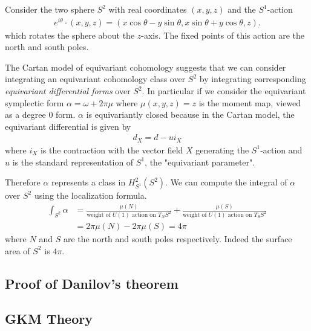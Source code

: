 \begin{example}
    Consider the two sphere $S^2$ with real coordinates $(x,y,z)$ and the $S^1$-action \begin{align*}
        e^{i\theta}\cdot(x,y,z) = (x\cos\theta - y\sin\theta, x\sin\theta + y\cos\theta, z).
    \end{align*}
    which rotates the sphere about the $z$-axis. The fixed points of this action are the north and south poles.

    \hfill 

    The Cartan model of equivariant cohomology suggests that we can consider integrating an equivariant cohomology
    class over $S^2$ by integrating corresponding \emph{equivariant differential forms} over $S^2$. In particular
    if we consider the equivariant symplectic form $\alpha = \omega + 2\pi\mu$ where $\mu(x,y,z) = z$
    is the moment map, viewed as a degree $0$ form. $\alpha$ is equivariantly closed because
    in the Cartan model, the equivariant differential is given by \begin{align*}
        d_X = d - ui_X
    \end{align*} where $i_X$ is the contraction with the vector field $X$ generating the $S^1$-action
    and $u$ is the standard representation of $S^1$, the "equivariant parameter". 

    Therefore $\alpha$ represents a class in $H^2_{S^1}(S^2)$. We can compute the integral of $\alpha$ over $S^2$ 
    using the localization formula. \begin{align*}
        \int_{S^2} \alpha &= \frac{\mu(N)}{\text{weight of $U(1)$ action on $T_N S^2$}} 
        + \frac{\mu(S)}{\text{weight of $U(1)$ action on $T_S S^2$}} \\
        &= 2\pi\mu(N) - 2\pi\mu(S) = 4\pi
    \end{align*} where $N$ and $S$ are the north and south poles respectively. Indeed
    the surface area of $S^2$ is $4\pi$.
\end{example}

\subsection{Proof of Danilov's theorem}
\subsection{GKM Theory}
